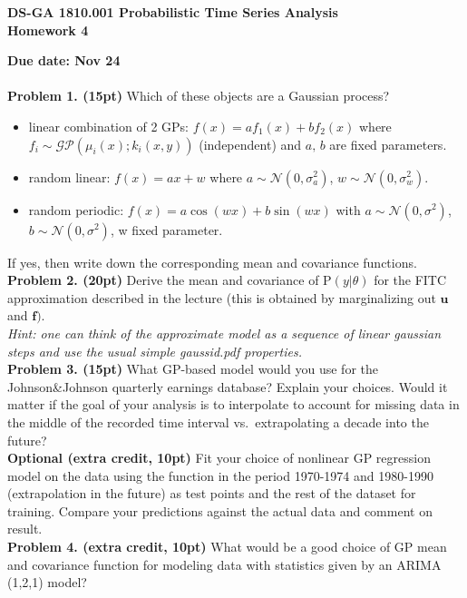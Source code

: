 \documentclass[12pt]{article}
\newcommand{\p}{\mathrm{P}}
\newcommand{\vect}[1]{\mathbf{#1}}
\begin{document}
\thispagestyle{empty}
\begin{center}

\textbf{DS-GA 1810.001 Probabilistic Time Series Analysis\\
Homework 4}
\end{center}

\noindent \textbf{Due date: Nov 24}\\
\\
\noindent \textbf{Problem 1. (15pt)} Which of these objects are a Gaussian process?
\begin{itemize}
\item linear combination of 2 GPs: $f(x) = a f_1(x) + b f_2(x)$ where $f_i \sim \mathcal{GP}(\mu_i(x); k_i(x,y))$ (independent) and $a,\, b$ are fixed parameters.
\item random linear: $ f(x) = a x + w$ where $a \sim \mathcal{N}(0,\sigma_a^2)$, $w\sim \mathcal{N}(0,\sigma_w^2)$.
\item random periodic: $f(x) = a \cos(wx)+ b \sin(wx)$ with $a \sim \mathcal{N}(0,\sigma^2)$, $b \sim \mathcal{N}(0,\sigma^2)$, w fixed parameter.
\end{itemize}
If yes, then write down the corresponding mean and covariance functions.\\

\noindent \textbf{Problem 2. (20pt)} 
Derive the mean and covariance of  $\mathrm{P}(y|\theta)$ for the FITC approximation described in the lecture (this is obtained by marginalizing out $\mathbf{u}$ and $\mathbf{f})$.\\
\noindent \emph{Hint: one can think of the approximate model as a sequence of linear gaussian steps and use the usual simple gaussid.pdf properties.}\\

\noindent \textbf{Problem 3. (15pt)} 
What GP-based model would you use for the Johnson\&Johnson quarterly earnings database?
Explain your choices. Would it matter if the goal of your analysis is to interpolate to account for missing data in the middle of the recorded time interval vs.\ extrapolating a decade into the future?\\

\noindent \textbf{Optional (extra credit, 10pt)}
Fit your choice of nonlinear GP regression model on the data using the function in the period 1970-1974 and 1980-1990 (extrapolation in the future) as test points and the rest of the dataset for training. Compare your predictions against the actual data and comment on result.\\

\noindent \textbf{Problem 4. (extra credit, 10pt)} 
What would be a good choice of GP mean and covariance function for modeling data with statistics given by an ARIMA (1,2,1) model?\\
\end{document}
